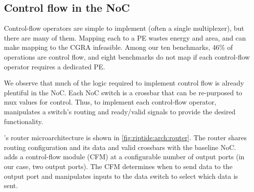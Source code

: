 \subsection{Control flow in the NoC}
\label{sec:fin}

Control-flow operators are simple to implement (often a single
multiplexer), but there are many of them.
%
Mapping each to a PE wastes energy and area, and can make mapping
to the CGRA infeasible.
%
Among our ten benchmarks,
46\% of operations are control flow,
and eight benchmarks do not map if each control-flow operator requires a dedicated PE.

We observe that much of the logic required to implement control flow is already
plentiful in the NoC.
%
Each NoC switch is a crossbar that can be re-purposed to mux values for
control.
%
Thus, to implement each control-flow operator, \riptide manipulates a switch's
routing and ready/valid signals to provide the desired functionality.

\riptide's router microarchitecture is shown in \autoref{fig:riptide:arch:router}.
% 
The router shares routing configuration and its data and valid crossbars with
the baseline NoC.
%
\riptide adds a control-flow module (CFM) at a configurable number of output ports (in our case, two output ports).
% 
The CFM determines when to send data to the output port and
manipulates inputs to the data switch to select which data is sent.



